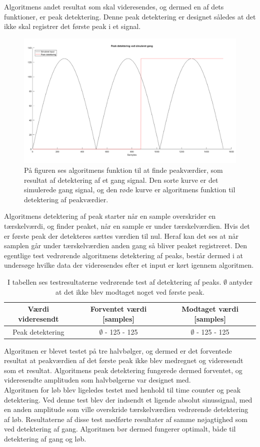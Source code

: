 Algoritmens andet resultat som skal videresendes, og dermed en af dets funktioner, er peak detektering. Denne peak detektering er designet således at det ikke skal registrer det første peak i et signal.
\begin{figure}[H]
	\centering
	\includegraphics[scale=0.3]{figures/cDesign/test_peak_gang.png}
	\caption{På figuren ses algoritmens funktion til at finde peakværdier, som resultat af detektering af et gang signal. Den sorte kurve er det simulerede gang signal, og den røde kurve er algoritmens funktion til detektering af peakværdier.}
	\label{fig:test_peak_gang}
\end{figure}
Algoritmens detektering af peak starter når en sample overskrider en tærskelværdi, og finder peaket, når en sample er under tærskelværdien. Hvis det er første peak der detekteres sættes værdien til nul. Heraf kan det ses at når samplen går under tærskelværdien anden gang så bliver peaket registreret. Den egentlige test vedrørende algoritmens detektering af peaks, består dermed i at undersøge hvilke data der videresendes efter et input er kørt igennem algoritmen.
\begin{table}[H]
	\centering
	\begin{tabular}{ccc}
		\hline
		\rowcolor[HTML]{C0C0C0} 
		Værdi videresendt & Forventet værdi [samples] & Modtaget værdi [samples] \\ \hline
		Peak detektering & $\emptyset$ - 125 - 125 & $\emptyset$ - 125 - 125 \\ \hline
	\end{tabular}
	\caption{I tabellen ses testresultaterne vedrørende test af detektering af peaks. $\emptyset$ antyder at det ikke blev modtaget noget ved første peak.}
	\label{tab:test_res_timecount}
\end{table}
Algoritmen er blevet testet på tre halvbølger, og dermed er det forventede resultat at peakværdien af det første peak ikke blev medregnet og videresendt som et resultat. Algoritmens peak detektering
fungerede dermed forventet, og videresendte amplituden som halvbølgerne var designet med. \\
Algoritmen for løb blev ligeledes testet med henhold til time counter og peak detektering. Ved denne test blev der indsendt et ligende absolut sinussignal, med en anden amplitude som ville overskride tærskelværdien vedrørende detektering af løb. Resultaterne af disse test medførte resultater af samme nøjagtighed som ved detektering af gang. Algoritmen bør dermed fungerer optimalt, både til detektering af gang og løb. 


